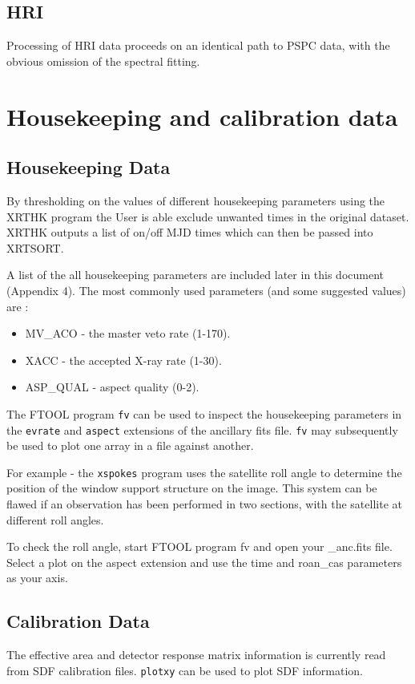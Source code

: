 \documentclass[11pt,fleqn]{article}    %
\begin{document}
\subsection{HRI}
Processing of HRI data proceeds on an identical path to PSPC data,
with the obvious omission of the spectral fitting.

\newpage
\section{Housekeeping and calibration data}
\subsection{Housekeeping Data}
By thresholding on the values of different housekeeping parameters  using the 
XRTHK program
the User  is able exclude  unwanted times in  the  original dataset.  XRTHK
outputs a list of on/off MJD times which can then be passed into XRTSORT.

A  list of  the  all housekeeping  parameters  are  included later in  this
document  (Appendix  4).  The  most   commonly used parameters   (and  some
suggested values) are :

\begin{itemize}
\item MV\_ACO - the master veto rate (1-170). 
\item XACC      - the accepted X-ray rate (1-30).
\item ASP\_QUAL - aspect quality (0-2).
\end{itemize}

The  FTOOL program  {\tt  fv} can be used   to  inspect the housekeeping
parameters in the {\tt evrate} and {\tt aspect} extensions of the ancillary
fits file. {\tt fv} may subsequently be  used to plot one
array in a file against another.

For example - the {\tt xspokes} program  uses the satellite  roll angle to 
determine
the position of the window support structure on the  image. This system can
be flawed if  an observation has been  performed in two  sections, with the
satellite at different roll angles.

To check the  roll angle, start FTOOL  program fv and open  your \_anc.fits
file. Select a  plot on the aspect extension  and use the time and roan\_cas
parameters as your axis.

\subsection{Calibration Data}
The  effective area and  detector response  matrix information is currently
read  from SDF calibration files. {\tt plotxy} can be used to plot SDF information.
\end{document}
